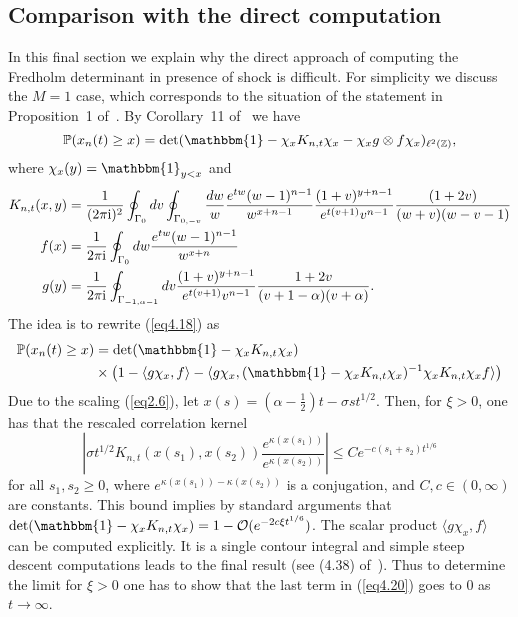 \documentclass[12pt,a4paper]{article}
\numberwithin{equation}{section}
\newcommand{\Or}{\mathcal{O}}
\newcommand{\Pb}{\mathbb{P}}
\newcommand{\Id}{\mathbbm{1}}
\newcommand{\I}{{\rm i}}
\newcommand{\Z}{\mathbb{Z}}
\begin{document}
\subsection{Comparison with the direct computation}\label{SectComparison}
In this final section we explain why the direct approach of computing the Fredholm determinant in presence of shock is difficult. For simplicity we discuss the $M=1$ case, which corresponds to the situation of the statement in Proposition~1 of~\cite{BFS09}. By Corollary~11 of~\cite{BFS09} we have
\begin{equation}\label{eq4.18}
\Pb(x_n(t)\geq x)=\det(\Id-\chi_x K_{n,t} \chi_x - \chi_x g\otimes f \chi_x)_{\ell^2(\Z)},
\end{equation}
where $\chi_x(y)=\Id_{y<x}$ and
\begin{equation}
\begin{aligned}\label{eqKernel1}
K_{n,t}(x,y)&=\frac{1}{(2\pi\I)^2}\oint_{\Gamma_0}dv \oint_{\Gamma_{0,-v}}\frac{d w}{w}\frac{e^{t w} (w-1)^{n-1}}{w^{x+n-1}}\frac{(1+v)^{y+n-1}}{e^{t(v+1)}v^{n-1}}\frac{(1+2v)}{(w+v)(w-v-1)} \\
f(x)&=\frac{1}{2\pi\I}\oint_{\Gamma_0}dw \frac{e^{t w} (w-1)^{n-1}}{w^{x+n}} \\
g(y)&=\frac{1}{2\pi\I}\oint_{\Gamma_{-1,\alpha-1}}dv \frac{(1+v)^{y+n-1}}{e^{t(v+1)} v^{n-1}}\frac{1+2v}{(v+1-\alpha)(v+\alpha)}.
\end{aligned}
\end{equation}
The idea is to rewrite (\ref{eq4.18}) as
\begin{equation}\label{eq4.20}
\begin{aligned}
\Pb(x_n(t)\geq x)&=\det(\Id-\chi_x K_{n,t} \chi_x) \\
&\times \left(1-\langle g \chi_x, f\rangle-\langle g \chi_x, (\Id-\chi_x K_{n,t} \chi_x)^{-1} \chi_x K_{n,t}\chi_x f\rangle\right)
\end{aligned}
\end{equation}
Due to the scaling (\ref{eq2.6}), let $x(s)=(\alpha-\tfrac12)t-\sigma s t^{1/2}$. Then, for $\xi>0$, one has that the rescaled correlation kernel
\begin{equation}\label{eq4.21}
\left|\sigma t^{1/2} K_{n,t}(x(s_1),x(s_2))\frac{e^{\kappa(x(s_1))}}{e^{\kappa(x(s_2))}} \right|\leq C e^{-c (s_1+s_2)t^{1/6}}
\end{equation}
for all $s_1,s_2\geq 0$, where $e^{\kappa(x(s_1))-\kappa(x(s_2))}$ is a conjugation, and $C,c\in(0,\infty)$ are constants.
This bound implies by standard arguments that $\det(\Id-\chi_x K_{n,t} \chi_x)=1-\Or(e^{-2 c \xi t^{1/6}})$. The scalar product $\langle g \chi_x, f\rangle$ can be computed explicitly. It is a single contour integral and simple steep descent computations leads to the final result (see (4.38) of~\cite{BFS09}). Thus to determine the limit for $\xi>0$ one has to show that the last term in (\ref{eq4.20}) goes to $0$ as $t\to\infty$.
\end{document}
